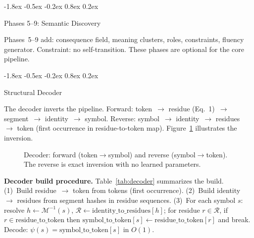 \documentclass[10pt]{article}
\makeatletter
\renewcommand{\subsection}{\@startsection{subsection}{2}{\z@}%
  {-1.8ex \@plus -0.5ex \@minus -0.2ex}%
  {0.8ex \@plus 0.2ex}%
  {\normalsize\bfseries\raggedright}}
\makeatother
\begin{document}
\subsection{Phases 5--9: Semantic Discovery}

Phases~5--9 add: consequence field, meaning clusters, roles, constraints, fluency
generator. Constraint: no self-transition. These phases are optional for the core
pipeline.

\subsection{Structural Decoder}

The decoder inverts the pipeline. Forward: token~$\rightarrow$ residue
(Eq.~1)~$\rightarrow$ segment~$\rightarrow$ identity~$\rightarrow$ symbol. Reverse:
symbol~$\rightarrow$ identity~$\rightarrow$ residues~$\rightarrow$ token (first
occurrence in residue-to-token map). Figure~\ref{fig:decoder} illustrates the inversion.

\begin{figure}[t]
\centering
{}
\caption{Decoder: forward (token$\rightarrow$symbol) and reverse (symbol$\rightarrow$token). The reverse is exact inversion with no learned parameters.}
\label{fig:decoder}
\end{figure}

\textbf{Decoder build procedure.}
Table~\ref{tab:decoder} summarizes the build. (1)~Build residue~$\rightarrow$ token
from tokens (first occurrence). (2)~Build identity~$\rightarrow$ residues from segment
hashes in residue sequences. (3)~For each symbol $s$: resolve
$h \gets \mathcal{M}^{-1}(s)$,
$\mathcal{R} \gets \text{identity\_to\_residues}[h]$; for residue $r \in \mathcal{R}$,
if $r \in \text{residue\_to\_token}$ then
$\text{symbol\_to\_token}[s] \gets \text{residue\_to\_token}[r]$ and break.
Decode: $\psi(s) = \text{symbol\_to\_token}[s]$ in $O(1)$.
\end{document}
